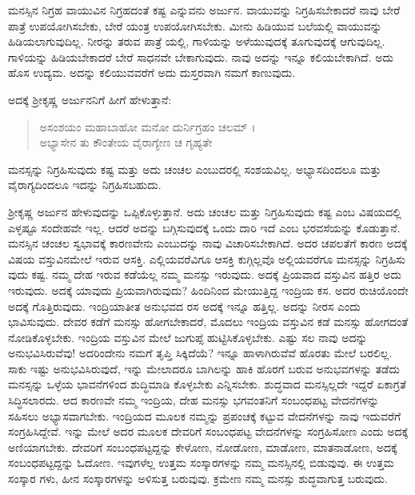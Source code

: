ಮನಸ್ಸಿನ ನಿಗ್ರಹ ವಾಯುವಿನ ನಿಗ್ರಹದಂತೆ ಕಷ್ಟ ಎನ್ನುವನು ಅರ್ಜುನ. ವಾಯುವನ್ನು ನಿಗ್ರಹಿಸಬೇಕಾದರೆ ನಾವು ಬೇರೆ ಪಾತ್ರೆ ಉಪಯೋಗಿಸಬೇಕು, ಬೇರೆ ಯಂತ್ರ ಉಪಯೋಗಿಸಬೇಕು. ಮೀನು ಹಿಡಿಯುವ ಬಲೆಯಲ್ಲಿ ವಾಯುವನ್ನು ಹಿಡಿಯಲಾಗುವುದಿಲ್ಲ. ನೀರನ್ನು ತರುವ ಪಾತ್ರೆ ಯಲ್ಲಿ, ಗಾಳಿಯನ್ನು ಅಳೆಯುವುದಕ್ಕೆ ತೂಗುವುದಕ್ಕೆ ಆಗುವುದಿಲ್ಲ. ಗಾಳಿಯನ್ನು ಹಿಡಿಯಬೇಕಾದರೆ ಬೇರೆ ಸಾಧನವೇ ಬೇಕಾಗುವುದು. ನಾವು ಅದನ್ನು ಇನ್ನೂ ಕಲಿಯಬೇಕಾಗಿದೆ. ಅದು ಹೊಸ ಉದ್ಯಮ. ಅದನ್ನು ಕಲಿಯುವವರೆಗೆ ಅದು ದುಸ್ತರವಾಗಿ ನಮಗೆ ಕಾಣುವುದು.

ಅದಕ್ಕೆ ಶ್ರೀಕೃಷ್ಣ ಅರ್ಜುನನಿಗೆ ಹೀಗೆ ಹೇಳುತ್ತಾನೆ:

\begin{verse}
ಅಸಂಶಯಂ ಮಹಾಬಾಹೋ ಮನೋ ದುರ್ನಿಗ್ರಹಂ ಚಲಮ್ ।\\ಅಭ್ಯಾಸೇನ ತು ಕೌಂತೇಯ ವೈರಾಗ್ಯೇಣ ಚ ಗೃಹ್ಯತೇ 
\end{verse}

{\small ಮನಸ್ಸನ್ನು ನಿಗ್ರಹಿಸುವುದು ಕಷ್ಟ ಮತ್ತು ಅದು ಚಂಚಲ ಎಂಬುದರಲ್ಲಿ ಸಂಶಯವಿಲ್ಲ. ಅಭ್ಯಾಸದಿಂದಲೂ ಮತ್ತು ವೈರಾಗ್ಯದಿಂದಲೂ ಇದನ್ನು ನಿಗ್ರಹಿಸಬಹುದು.}

ಶ್ರೀಕೃಷ್ಣ ಅರ್ಜುನ ಹೇಳುವುದನ್ನು ಒಪ್ಪಿಕೊಳ್ಳುತ್ತಾನೆ. ಅದು ಚಂಚಲ ಮತ್ತು ನಿಗ್ರಹಿಸುವುದು ಕಷ್ಟ ಎಂಬ ವಿಷಯದಲ್ಲಿ ಎಳ್ಳಷ್ಟೂ ಸಂದೇಹವೇ ಇಲ್ಲ. ಆದರೆ ಅದನ್ನು ಬಗ್ಗಿಸುವುದಕ್ಕೆ ಒಂದು ದಾರಿ ಇದೆ ಎಂಬ ಭರವಸೆಯನ್ನು ಕೊಡುತ್ತಾನೆ. ಮನಸ್ಸಿನ ಚಂಚಲ ಸ್ವಭಾವಕ್ಕೆ ಕಾರಣವೇನು ಎಂಬುದನ್ನು ನಾವು ವಿಚಾರಿಸಬೇಕಾಗಿದೆ. ಅದರ ಚಪಲತೆಗೆ ಕಾರಣ ಅದಕ್ಕೆ ವಿಷಯ ವಸ್ತುವಿನಮೇಲೆ ಇರುವ ಆಸಕ್ತಿ. ಎಲ್ಲಿಯವರೆವಿಗೂ ಆಸಕ್ತಿ ಕುಗ್ಗಿಲ್ಲವೊ ಅಲ್ಲಿಯವರೆಗೂ ಮನಸ್ಸನ್ನು ನಿಗ್ರಹಿಸು ವುದು ಕಷ್ಟ. ನಮ್ಮ ದೇಹ ಇರುವ ಕಡೆಯೆಲ್ಲ ನಮ್ಮ ಮನಸ್ಸು ಇರುವುದು. ಅದಕ್ಕೆ ಪ್ರಿಯವಾದ ವಸ್ತುವಿನ ಹತ್ತಿರ ಅದು ಇರುವುದು. ಅದಕ್ಕೆ ಯಾವುದು ಪ್ರಿಯವಾಗಿರುವುದು? ಹಿಂದಿನಿಂದ ಮೇಯುತ್ತಿದ್ದ ಇಂದ್ರಿಯ ಕಸ. ಅದರ ರುಚಿಯೊಂದೇ ಅದಕ್ಕೆ ಗೊತ್ತಿರುವುದು. ಇಂದ್ರಿಯಾತೀತ ಅನುಭವದ ರಸ ಅದಕ್ಕೆ ಇನ್ನೂ ಹತ್ತಿಲ್ಲ. ಅದನ್ನು ನೀರಸ ಎಂದು ಭಾವಿಸುವುದು. ದೇವರ ಕಡೆಗೆ ಮನಸ್ಸು ಹೋಗಬೇಕಾದರೆ, ಮೊದಲು ಇಂದ್ರಿಯ ವಸ್ತುವಿನ ಕಡೆ ಮನಸ್ಸು ಹೋಗದಂತೆ ನೋಡಿಕೊಳ್ಳಬೇಕು. ಇಂದ್ರಿಯ ವಸ್ತುವಿನ ಮೇಲೆ ಜುಗುಪ್ಸೆ ಹುಟ್ಟಿಸಿಕೊಳ್ಳಬೇಕು. ಎಷ್ಟು ಸಲ ನಾವು ಅದನ್ನು ಅನುಭವಿಸಿರುವೆವು! ಅದರಿಂದೇನು ನಮಗೆ ತೃಪ್ತಿ ಸಿಕ್ಕಿದೆಯೆ? ಇನ್ನೂ ಹಾಳಾಗಿರುವೆವೆ ಹೊರತು ಮೇಲೆ ಬರಲಿಲ್ಲ. ಸಾಕು ಇಷ್ಟು ಅನುಭವಿಸಿರುವುದೆ, ಇನ್ನು ಮೇಲಾದರೂ ಬಾಗಿಲನ್ನು ಹಾಕಿ ಹೊರಗೆ ಬರುವ ಅನುಭವಗಳನ್ನು ತಡೆದು ಮನಸ್ಸನ್ನು ಒಳ್ಳೆಯ ಭಾವನೆಗಳಿಂದ ಶುದ್ಧಿಮಾಡಿ ಕೊಳ್ಳಬೇಕು ಎನ್ನಿಸಬೇಕು. ಶುದ್ಧವಾದ ಮನಸ್ಸಿಲ್ಲದೇ ಇದ್ದರೆ ಏಕಾಗ್ರತೆ ಸಿದ್ಧಿಸಲಾರದು. ಆದ ಕಾರಣವೇ ನಮ್ಮ ಇಂದ್ರಿಯ, ದೇಹ ಮನಸ್ಸು ಭಗವಂತನಿಗೆ ಸಂಬಂಧಪಟ್ಟ ವೇದನೆಗಳನ್ನು ಸಹಿಸಲು ಅಭ್ಯಾಸವಾಗಬೇಕು. ಇಂದ್ರಿಯದ ಮೂಲಕ ನಮ್ಮನ್ನು ಪ್ರಪಂಚಕ್ಕೆ ಕಟ್ಟುವ ವೇದನೆಗಳನ್ನು ನಾವು ಇದುವರೆಗೆ ಸಂಗ್ರಹಿಸಿದ್ದೇವೆ. ಇನ್ನು ಮೇಲೆ ಅದರ ಮೂಲಕ ದೇವರಿಗೆ ಸಂಬಂಧಪಟ್ಟ ವೇದನೆಗಳನ್ನು ಸಂಗ್ರಹಿಸೋಣ ಎಂದು ಅದಕ್ಕೆ ಅಣಿಯಾಗಬೇಕು. ದೇವರಿಗೆ ಸಂಬಂಧಪಟ್ಟದ್ದನ್ನು ಕೇಳೋಣ, ನೋಡೋಣ, ಮಾಡೋಣ, ಮಾತನಾಡೋಣ, ಅದಕ್ಕೆ ಸಂಬಂಧಪಟ್ಟದ್ದನ್ನು ಓದೋಣ. ಇವುಗಳೆಲ್ಲ ಉತ್ತಮ ಸಂಸ್ಕಾರಗಳನ್ನು ನಮ್ಮ ಮನಸ್ಸಿನಲ್ಲಿ ಬಿಡುವುವು. ಈ ಉತ್ತಮ ಸಂಸ್ಕಾರ ಗಳು, ಹೀನ ಸಂಸ್ಕಾರಗಳನ್ನು ಅಳಿಸುತ್ತ ಬರುವುವು. ಕ್ರಮೇಣ ನಮ್ಮ ಮನಸ್ಸು ಶುದ್ಧವಾಗುತ್ತ ಬರುವುದು.

